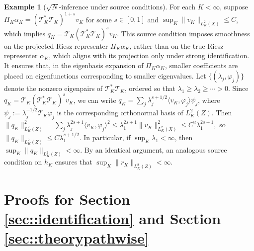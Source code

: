 \documentclass[11pt]{article}
\theoremstyle{plain}
\theoremstyle{definition}
\newtheorem{example}{Example}
\theoremstyle{remark}
\theoremstyle{definition}
\begin{document}
\begin{example}[$\sqrt{N}$-inference under source conditions]
  For each \(K < \infty\), suppose \(\Pi_K \alpha_K = (\mathcal{T}_K^* \mathcal{T}_K)^{1+s} v_K\) for some \(s \in [0,1]\) and \(\sup_K \|v_K\|_{L^2_K(X)} \le C\), which implies \(q_K = \mathcal{T}_K(\mathcal{T}_K^* \mathcal{T}_K)^s v_K\). This source condition imposes smoothness on the projected Riesz representer \(\Pi_K \alpha_K\), rather than on the true Riesz representer \(\alpha_K\), which aligns with its projection only under strong identification. It ensures that, in the eigenbasis expansion of \(\Pi_K \alpha_K\), smaller coefficients are placed on eigenfunctions corresponding to smaller eigenvalues. Let \(\{(\lambda_j, \varphi_j)\}\) denote the nonzero eigenpairs of \(\mathcal{T}_K^* \mathcal{T}_K\), ordered so that \(\lambda_1 \ge \lambda_2 \ge \cdots > 0\). Since \(q_K = \mathcal{T}_K (\mathcal{T}_K^* \mathcal{T}_K)^s v_K\), we can write \(q_K = \sum_j \lambda_j^{s + 1/2} \langle v_K, \varphi_j \rangle \psi_j\), where \(\psi_j := \lambda_j^{-1/2} \mathcal{T}_K \varphi_j\) is the corresponding orthonormal basis of \(L^2_K(Z)\). Then $\|q_K\|_{L^2_K(Z)}^2 = \sum_j \lambda_j^{2s + 1} \langle v_K, \varphi_j \rangle^2 \le \lambda_1^{2s + 1} \|v_K\|_{L^2_K(X)}^2 \le C^2 \lambda_1^{2s + 1},$
so \(\|q_K\|_{L^2_K(Z)} \le C \lambda_1^{s + 1/2}\). In particular, if \(\sup_K \lambda_1 < \infty\), then \(\sup_K \|q_K\|_{L^2_K(Z)} < \infty\). By an identical argument, an analogous source condition on \(h_K\) ensures that \(\sup_K \|r_K\|_{L^2_K(Z)} < \infty\).
\end{example}

 







\section{Proofs for Section \ref{sec::identification} and Section \ref{sec::theorypathwise}}
\end{document}

